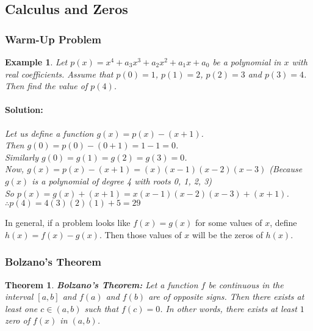 \documentclass[14]{article}
\newtheorem{theorem}{Theorem}
\newtheorem*{ex}{Example}
\begin{document}
\subsection{Calculus and Zeros}
\subsubsection{Warm-Up Problem}
\begin{ex}
Let $p(x) = x^4 + a_3x^3 + a_2 x^2 + a_1x + a_0$ be a polynomial in $x$ with real coefficients. Assume that $p(0) = 1$, $p(1) = 2$, $p(2) = 3$ and $p(3) = 4$. Then find the value of $p(4)$.
\paragraph{Solution:} Let us define a function $g(x) = p(x) - (x + 1)$.\\
Then $g(0) = p(0) - (0 + 1) = 1 - 1 = 0$.\\
Similarly $g(0) = g(1) = g(2) = g(3) = 0$.\\
Now, $g(x) =  p(x) - (x + 1) = (x)(x-1)(x-2)(x-3)$ (Because $g(x)$ is a polynomial of degree 4 with roots 0, 1, 2, 3)\\
So $p(x) = g(x) + (x +1) = x(x-1)(x-2)(x-3) + (x + 1) $.\\  
$\therefore p(4) = 4(3)(2)(1) + 5 = 29$
\end{ex}
In general, if a problem looks like $f(x) = g(x)$ for some values of $x$, define $h(x) = f(x) - g(x).$ Then those values of $x$ will be the zeros of $h(x)$.
\subsubsection{Bolzano's Theorem}
\begin{theorem}
\textbf{Bolzano's Theorem:} Let a function $f$ be continuous in the interval $[a, b]$ and $f(a)$ and $f(b)$ are of opposite signs. Then there exists at least one $c \in (a, b)$ such that $f(c) = 0$. In other words, there exists at least $1$ zero of $f(x)$ in $(a, b)$.
\end{theorem}
\end{document}
